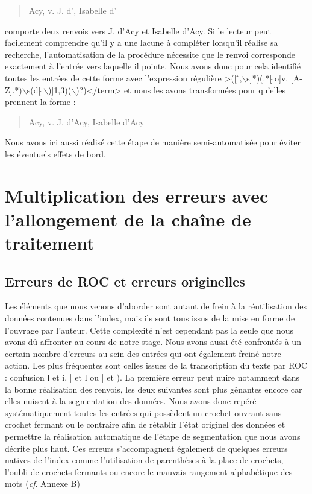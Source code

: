 \documentclass[a4paper,12pt,twoside]{book}
\begin{document}
	\begin{quotation}
		Acy, v. J. d', Isabelle d'
	\end{quotation}

	\noindent comporte deux renvois vers \og J. d'Acy\fg{} et \og Isabelle d'Acy\fg{}. Si le lecteur peut facilement comprendre qu'il y a une lacune à compléter lorsqu'il réalise sa recherche, l'automatisation de la procédure nécessite que le renvoi corresponde exactement à l'entrée vers laquelle il pointe. Nous avons donc pour cela identifié toutes les entrées de cette forme avec l'expression régulière \og >([\,\^\,,$\backslash$s]*)(.*[\,$\hat{}$\,o]v. [A-Z].*)$\backslash$s(d[\,$\hat{}$\,$\backslash$)]{1,3})($\backslash$)?)</term>\fg{} et nous les avons transformées pour qu'elles prennent la forme :
	
	\begin{quotation}
		Acy, v. J. d'Acy, Isabelle d'Acy
	\end{quotation}

	\noindent Nous avons ici aussi réalisé cette étape de manière semi-automatisée pour éviter les éventuels effets de bord.
	
	\section{Multiplication des erreurs avec l’allongement de la chaîne de traitement}
	
	\subsection{Erreurs de ROC et erreurs originelles}
	
	Les éléments que nous venons d'aborder sont autant de frein à la réutilisation des données contenues dans l'index, mais ils sont tous issus de la mise en forme de l'ouvrage par l'auteur. Cette complexité n'est cependant pas la seule que nous avons dû affronter au cours de notre stage. Nous avons aussi été confrontés à un certain nombre d'erreurs au sein des entrées qui ont également freiné notre action. Les plus fréquentes sont celles issues de la transcription du texte par ROC : confusion \og l\fg{} et \og i\fg{}, \og ]\fg{} et \og l\fg{} ou \og ]\fg{} et \og )\fg{}. La première erreur peut nuire notamment dans la bonne réalisation des renvois, les deux suivantes sont plus gênantes encore car elles nuisent à la segmentation des données. Nous avons donc repéré systématiquement toutes les entrées qui possèdent un crochet ouvrant sans crochet fermant ou le contraire afin de rétablir l'état originel des données et permettre la réalisation automatique de l'étape de segmentation que nous avons décrite plus haut. Ces erreurs s'accompagnent également de quelques erreurs natives de l'index comme l'utilisation de parenthèses à la place de crochets, l'oubli de crochets fermants ou encore le mauvais rangement alphabétique des mots (\textit{cf}. Annexe B)
	
\end{document}
